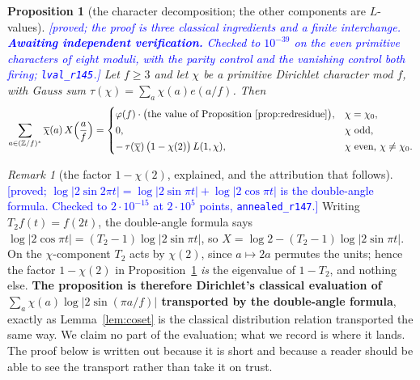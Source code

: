 \documentclass[11pt,a4paper]{article}
\theoremstyle{plain}
\newtheorem{proposition}[theorem]{Proposition}
\theoremstyle{definition}
\theoremstyle{remark}
\newtheorem{remark}[theorem]{Remark}
\newcommand{\STATUS}[1]{\textcolor{blue}{\textsf{[#1]}}}
\begin{document}
\begin{proposition}[the character decomposition; the other components are $L$-values]\label{prop:chardecomp}
\STATUS{proved; the proof is three classical ingredients and a finite interchange.
\textbf{Awaiting independent verification.} Checked to $10^{-39}$ on the even primitive
characters of eight moduli, with the parity control and the vanishing control both firing;
\texttt{lval\_r145}.}
Let $f\ge3$ and let $\chi$ be a primitive Dirichlet character mod $f$, with Gauss sum
$\tau(\chi)=\sum_{a}\chi(a)e(a/f)$. Then
\[
  \sum_{a\in(\mathbb{Z}/f)^{*}}\overline{\chi}(a)\,X\Bigl(\frac af\Bigr)
  =\begin{cases}
     \varphi(f)\cdot\bigl(\text{the value of Proposition~\ref{prop:redresidue}}\bigr), & \chi=\chi_{0},\\[2pt]
     0, & \chi \text{ odd},\\[2pt]
     -\,\tau(\overline{\chi})\,\bigl(1-\chi(2)\bigr)\,L(1,\chi), & \chi \text{ even, }\chi\ne\chi_{0}.
   \end{cases}
\]
\end{proposition}

\begin{remark}[the factor $1-\chi(2)$, explained, and the attribution that follows]\label{rem:doubleangle}
\STATUS{proved; $\log|2\sin2\pi t|=\log|2\sin\pi t|+\log|2\cos\pi t|$ is the double-angle formula.
Checked to $2\cdot10^{-15}$ at $2\cdot10^{5}$ points, \texttt{annealed\_r147}.}
Writing $T_2f(t)=f(2t)$, the double-angle formula says
$\log|2\cos\pi t|=(T_2-1)\log|2\sin\pi t|$, so $X=\log2-(T_2-1)\log|2\sin\pi t|$. On the
$\chi$-component $T_2$ acts by $\chi(2)$, since $a\mapsto2a$ permutes the units; hence the factor
$1-\chi(2)$ in Proposition~\ref{prop:chardecomp} \emph{is} the eigenvalue of $1-T_2$, and nothing
else. \textbf{The proposition is therefore Dirichlet's classical evaluation of
$\sum_a\chi(a)\log|2\sin(\pi a/f)|$ transported by the double-angle formula}, exactly as
Lemma~\ref{lem:coset} is the classical distribution relation transported the same way. We claim
no part of the evaluation; what we record is where it lands. The proof below is written out
because it is short and because a reader should be able to see the transport rather than take it
on trust.
\end{remark}
\end{document}
